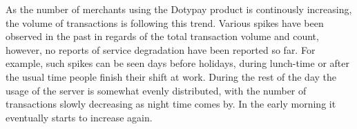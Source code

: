 \documentclass[12pt, a4paper]{article}
\begin{document}
As the number of merchants using the Dotypay product is continously increasing, the volume of transactions is following this trend.
Various spikes have been observed in the past in regards of the total transaction volume and count, however, no reports of service degradation have been reported so far.
For example, such spikes can be seen days before holidays, during lunch-time or after the usual time people finish their shift at work. During the rest of the day the usage of the server is somewhat evenly distributed, with the number of transactions slowly decreasing as night time comes by. In the early morning it eventually starts to increase again.
\end{document}
